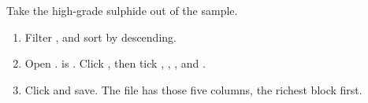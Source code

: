 \begin{tryit}
Take the high-grade sulphide out of the sample.
\begin{enumerate}
\item Filter , and sort by  descending.
\item Open .  is . Click , then tick ,
, ,  and .
\item Click  and save. The file has those five columns, the richest block first.
\end{enumerate}
\end{tryit}
